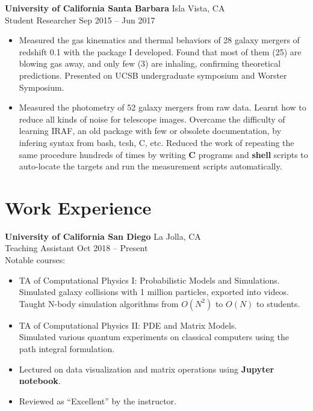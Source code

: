 \documentclass[letterpaper,12pt]{article}
\newenvironment{zitemize}{
\begin{itemize} \vspace{-.9em}\itemsep 0pt \parskip 0pt}
{\end{itemize}\vspace{-.5em}}
\newcommand{\proglang}[1]{\textbf{#1}}
\begin{document}
\textbf{University of California Santa Barbara} \hfill Isla Vista, CA \\
Student Researcher \hfill Sep 2015 -- Jun 2017 \\
\begin{zitemize}
    \item Measured the gas kinematics and thermal behaviors of 28 galaxy mergers of redshift 0.1 with the package I developed. Found that most of them (25) are blowing gas away, and only few (3) are inhaling, confirming theoretical predictions. Presented on UCSB undergraduate symposium and Worster Symposium.
    \item Measured the photometry of 52 galaxy mergers from raw data. Learnt how to reduce all kinds of noise for telescope images. Overcame the difficulty of learning IRAF, an old package with few or obsolete documentation, by infering syntax from bash, tcsh, C, etc. Reduced the work of repeating the same procedure hundreds of times by writing \proglang{C} programs and \proglang{shell} scripts to auto-locate the targets and run the measurement scripts automatically.
\end{zitemize}



\section{Work Experience}

\textbf{University of California San Diego} \hfill La Jolla, CA \\
Teaching Assistant \hfill Oct 2018 -- Present \\
Notable courses:
\begin{zitemize}
    \item TA of Computational Physics I: Probabilistic Models and Simulations. \\
    Simulated galaxy collisions with 1 million particles, exported into videos. \\
    Taught N-body simulation algorithms from $O(N^2)$ to $O(N)$ to students.
    \item TA of Computational Physics II: PDE and Matrix Models. \\
    Simulated various quantum experiments on classical computers using the path integral formulation.
    \item Lectured on data visualization and matrix operations using \proglang{Jupyter notebook}.
    \item Reviewed as ``Excellent'' by the instructor.
\end{zitemize}
\end{document}
